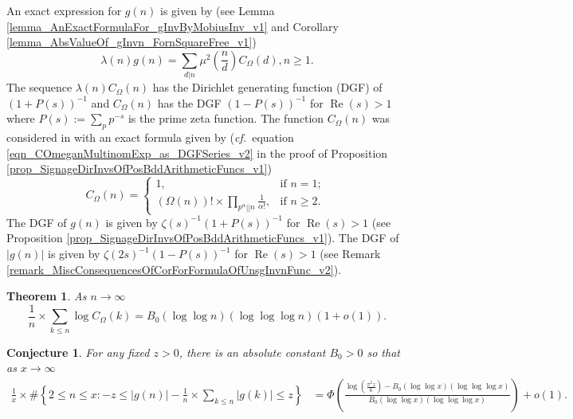 \documentclass[11pt,reqno,a4letter]{article}
\newcommand{\hlocalref}[1]{\hyperref[#1]{\ref{#1}}}
\numberwithin{equation}{section}
\numberwithin{figure}{section}
\numberwithin{table}{section}
\newcommand{\cf}{\textit{cf.\ }}
\theoremstyle{plain}
\newtheorem{theorem}{Theorem}
\numberwithin{theorem}{section}
\newtheorem*{conjecture*}{Conjecture}
\theoremstyle{definition}
\renewcommand{\Re}{\operatorname{Re}}
\begin{document}
An exact expression for $g(n)$ is given by 
(see Lemma \hlocalref{lemma_AnExactFormulaFor_gInvByMobiusInv_v1} and 
Corollary \hlocalref{lemma_AbsValueOf_gInvn_FornSquareFree_v1}) 
\begin{equation}
\label{eqn_gInvn_ExactDivisorSumFormula_WithSgnWeight_v1} 
\lambda(n) g(n) = \sum_{d|n} \mu^2\left(\frac{n}{d}\right) C_{\Omega}(d), n \geq 1. 
\end{equation}
The sequence $\lambda(n) C_{\Omega}(n)$ has the 
Dirichlet generating function (DGF) of $(1 + P(s))^{-1}$ and 
$C_{\Omega}(n)$ has the DGF $(1-P(s))^{-1}$ for $\Re(s) > 1$ 
where $P(s) := \sum_p p^{-s}$ is the prime zeta function. 
The function $C_{\Omega}(n)$ was considered in 
\cite{FROBERG-1968} with an exact formula given by 
(\cf equation \eqref{eqn_COmeganMultinomExp_as_DGFSeries_v2} in the 
proof of Proposition \hlocalref{prop_SignageDirInvsOfPosBddArithmeticFuncs_v1}) 
\begin{equation}
\label{eqn_proof_tag_hInvn_ExactNestedSumFormula_CombInterpetIdent_v3}
C_{\Omega}(n) = \begin{cases}
     1, & \text{if $n = 1$; } \\ 
     (\Omega(n))! \times \prod\limits_{p^{\alpha}||n} \frac{1}{\alpha!}, & \text{if $n \geq 2$. }
     \end{cases}
\end{equation} 
The DGF of $g(n)$ is given by $\zeta(s)^{-1} (1 + P(s))^{-1}$ for $\Re(s) > 1$ 
(see Proposition \hlocalref{prop_SignageDirInvsOfPosBddArithmeticFuncs_v1}). 
The DGF of $|g(n)|$ is given by $\zeta(2s)^{-1} (1 - P(s))^{-1}$ for $\Re(s) > 1$ 
(see Remark \hlocalref{remark_MiscConsequencesOfCorForFormulaOfUnsgInvnFunc_v2}). 

\begin{theorem} 
\label{lemma_HatCAstxSum_ExactFormulaWithError_v1} 
As $n \rightarrow \infty$ 
\[
\frac{1}{n} \times \sum_{k \leq n} \log C_{\Omega}(k) = 
     B_0 (\log\log n)(\log\log\log n) \left(1 + o(1)\right). 
\] 
\end{theorem} 

\begin{conjecture*}
For any fixed $z > 0$, there is an absolute constant $B_0 > 0$ so that as $x \rightarrow \infty$ 
\begin{align*} 
\frac{1}{x} \times \#\left\{2 \leq n \leq x: -z \leq |g(n)| - 
     \frac{1}{n} \times \sum_{k \leq n} |g(k)| \leq z\right\} & = 
	\Phi\left(\frac{\log\left(\frac{\pi^2 z}{6}\right) - B_0 (\log\log x) (\log\log\log x)}{ 
	B_0 (\log\log x)(\log\log\log x)}\right) + o(1).
\end{align*} 
\end{conjecture*}
\end{document}
